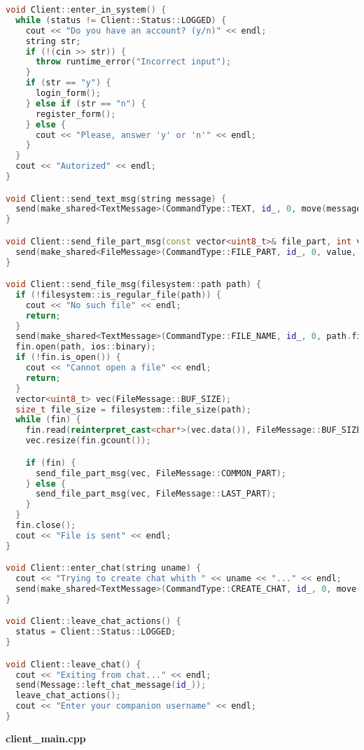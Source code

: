 \begin{lstlisting}[language=C++]
void Client::enter_in_system() {
  while (status != Client::Status::LOGGED) {
    cout << "Do you have an account? (y/n)" << endl;
    string str;
    if (!(cin >> str)) {
      throw runtime_error("Incorrect input");
    }
    if (str == "y") {
      login_form();
    } else if (str == "n") {
      register_form();
    } else {
      cout << "Please, answer 'y' or 'n'" << endl;
    }
  }
  cout << "Autorized" << endl;
}

void Client::send_text_msg(string message) {
  send(make_shared<TextMessage>(CommandType::TEXT, id_, 0, move(message)));
}

void Client::send_file_part_msg(const vector<uint8_t>& file_part, int value) {
  send(make_shared<FileMessage>(CommandType::FILE_PART, id_, 0, value, move(file_part)));
}

void Client::send_file_msg(filesystem::path path) {
  if (!filesystem::is_regular_file(path)) {
    cout << "No such file" << endl;
    return;
  }
  send(make_shared<TextMessage>(CommandType::FILE_NAME, id_, 0, path.filename()));
  fin.open(path, ios::binary);
  if (!fin.is_open()) {
    cout << "Cannot open a file" << endl;
    return;
  }
  vector<uint8_t> vec(FileMessage::BUF_SIZE);
  size_t file_size = filesystem::file_size(path);
  while (fin) {
    fin.read(reinterpret_cast<char*>(vec.data()), FileMessage::BUF_SIZE);
    vec.resize(fin.gcount());

    if (fin) {
      send_file_part_msg(vec, FileMessage::COMMON_PART);
    } else {
      send_file_part_msg(vec, FileMessage::LAST_PART);
    }
  }
  fin.close();
  cout << "File is sent" << endl;
}

void Client::enter_chat(string uname) {
  cout << "Trying to create chat whith " << uname << "..." << endl;
  send(make_shared<TextMessage>(CommandType::CREATE_CHAT, id_, 0, move(uname)));
}

void Client::leave_chat_actions() {
  status = Client::Status::LOGGED;
}

void Client::leave_chat() {
  cout << "Exiting from chat..." << endl;
  send(Message::left_chat_message(id_));
  leave_chat_actions();
  cout << "Enter your companion username" << endl;
}


\end{lstlisting}

\textbf{client\_main.cpp}

